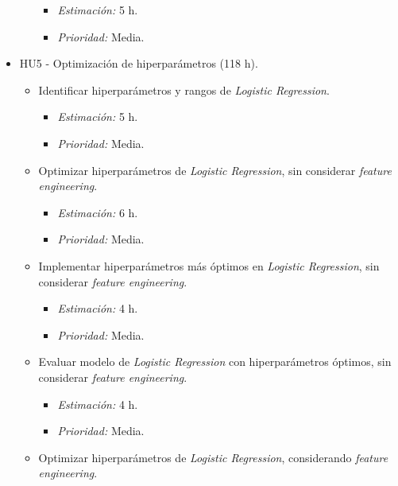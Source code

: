 \documentclass[
11pt, %
]{charter}
\begin{document}
\begin{itemize}
\begin{itemize}
                \begin{itemize}
                    \item \textit{Estimación:} 5 h.
                    \item \textit{Prioridad:} Media.
                \end{itemize}
        \end{itemize}
    \item HU5 - Optimización de hiperparámetros (118 h).
        \begin{itemize}
            \item Identificar hiperparámetros y rangos de \textit{Logistic Regression}.
                \begin{itemize}
                    \item \textit{Estimación:} 5 h.
                    \item \textit{Prioridad:} Media.
                \end{itemize}
            \item Optimizar hiperparámetros de \textit{Logistic Regression}, sin considerar \textit{feature engineering}.
                \begin{itemize}
                    \item \textit{Estimación:} 6 h.
                    \item \textit{Prioridad:} Media.
                \end{itemize}
            \item Implementar hiperparámetros más óptimos en \textit{Logistic Regression}, sin considerar \textit{feature engineering}.
                \begin{itemize}
                    \item \textit{Estimación:} 4 h.
                    \item \textit{Prioridad:} Media.
                \end{itemize}
            \item Evaluar modelo de \textit{Logistic Regression} con hiperparámetros óptimos, sin considerar \textit{feature engineering}.
                \begin{itemize}
                    \item \textit{Estimación:} 4 h.
                    \item \textit{Prioridad:} Media.
                \end{itemize}
            \item Optimizar hiperparámetros de \textit{Logistic Regression}, considerando \textit{feature engineering}.

\end{itemize}
\end{itemize}
\end{document}

